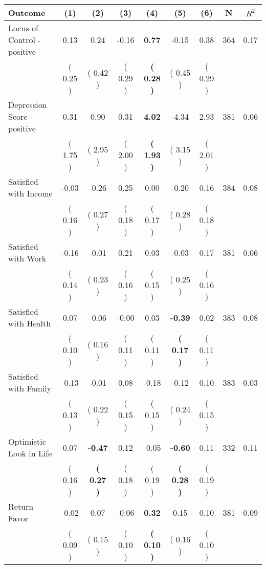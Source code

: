\begin{tabular}{lcccccccc}
\toprule
 \textbf{Outcome} & \textbf{(1)} & \textbf{(2)} & \textbf{(3)} & \textbf{(4)} & \textbf{(5)} & \textbf{(6)} & \textbf{N} & \textbf{$ R^2$} \\
\midrule
Locus of Control - positive &      0.13 &      0.24 &     -0.16 & \textbf{     0.77} &     -0.15 &      0.38 & 364 &       0.17 \\ 
 & (     0.25 ) & (     0.42 ) & (     0.29 ) & \textbf{(     0.28 )} & (     0.45 ) & (     0.29 ) & \\
Depression Score - positive &      0.31 &      0.90 &      0.31 & \textbf{     4.02} &     -4.34 &      2.93 & 381 &       0.06 \\ 
 & (     1.75 ) & (     2.95 ) & (     2.00 ) & \textbf{(     1.93 )} & (     3.15 ) & (     2.01 ) & \\
Satisfied with Income &     -0.03 &     -0.26 &      0.25 &      0.00 &     -0.20 &      0.16 & 384 &       0.08 \\ 
 & (     0.16 ) & (     0.27 ) & (     0.18 ) & (     0.17 ) & (     0.28 ) & (     0.18 ) & \\
Satisfied with Work &     -0.16 &     -0.01 &      0.21 &      0.03 &     -0.03 &      0.17 & 381 &       0.06 \\ 
 & (     0.14 ) & (     0.23 ) & (     0.16 ) & (     0.15 ) & (     0.25 ) & (     0.16 ) & \\
Satisfied with Health &      0.07 &     -0.06 &     -0.00 &      0.03 & \textbf{    -0.39} &      0.02 & 383 &       0.08 \\ 
 & (     0.10 ) & (     0.16 ) & (     0.11 ) & (     0.11 ) & \textbf{(     0.17 )} & (     0.11 ) & \\
Satisfied with Family &     -0.13 &     -0.01 &      0.08 &     -0.18 &     -0.12 &      0.10 & 383 &       0.03 \\ 
 & (     0.13 ) & (     0.22 ) & (     0.15 ) & (     0.15 ) & (     0.24 ) & (     0.15 ) & \\
Optimistic Look in Life &      0.07 & \textbf{    -0.47} &      0.12 &     -0.05 & \textbf{    -0.60} &      0.11 & 332 &       0.11 \\ 
 & (     0.16 ) & \textbf{(     0.27 )} & (     0.18 ) & (     0.19 ) & \textbf{(     0.28 )} & (     0.19 ) & \\
Return Favor &     -0.02 &      0.07 &     -0.06 & \textbf{     0.32} &      0.15 &      0.10 & 381 &       0.09 \\ 
 & (     0.09 ) & (     0.15 ) & (     0.10 ) & \textbf{(     0.10 )} & (     0.16 ) & (     0.10 ) & \\

\end{tabular}
